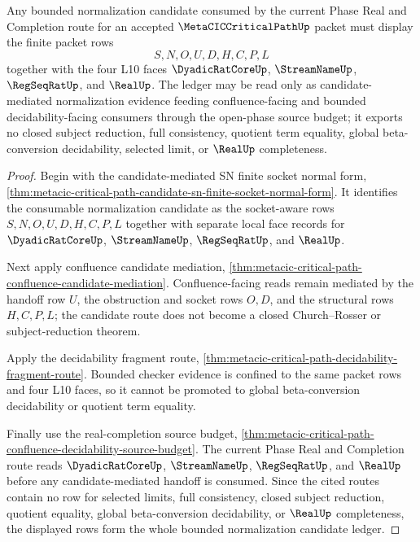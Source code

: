 \begin{theorem}
\label{thm:metacic-critical-path-bounded-normalization-candidate-ledger}
Any bounded normalization candidate consumed by the current Phase Real and Completion route for an accepted $\MetaCICCriticalPathUp$ packet must display the finite packet rows
$$
S,N,O,U,D,H,C,P,L
$$
together with the four L10 faces $\DyadicRatCoreUp$, $\StreamNameUp$, $\RegSeqRatUp$, and $\RealUp$. The ledger may be read only as candidate-mediated normalization evidence feeding confluence-facing and bounded decidability-facing consumers through the open-phase source budget; it exports no closed subject reduction, full consistency, quotient term equality, global beta-conversion decidability, selected limit, or $\RealUp$ completeness.
\end{theorem}
\begin{proof}
Begin with the candidate-mediated SN finite socket normal form, \autoref{thm:metacic-critical-path-candidate-sn-finite-socket-normal-form}. It identifies the consumable normalization candidate as the socket-aware rows $S,N,O,U,D,H,C,P,L$ together with separate local face records for $\DyadicRatCoreUp$, $\StreamNameUp$, $\RegSeqRatUp$, and $\RealUp$.

Next apply confluence candidate mediation, \autoref{thm:metacic-critical-path-confluence-candidate-mediation}. Confluence-facing reads remain mediated by the handoff row $U$, the obstruction and socket rows $O,D$, and the structural rows $H,C,P,L$; the candidate route does not become a closed Church--Rosser or subject-reduction theorem.

Apply the decidability fragment route, \autoref{thm:metacic-critical-path-decidability-fragment-route}. Bounded checker evidence is confined to the same packet rows and four L10 faces, so it cannot be promoted to global beta-conversion decidability or quotient term equality.

Finally use the real-completion source budget, \autoref{thm:metacic-critical-path-confluence-decidability-source-budget}. The current Phase Real and Completion route reads $\DyadicRatCoreUp$, $\StreamNameUp$, $\RegSeqRatUp$, and $\RealUp$ before any candidate-mediated handoff is consumed. Since the cited routes contain no row for selected limits, full consistency, closed subject reduction, quotient equality, global beta-conversion decidability, or $\RealUp$ completeness, the displayed rows form the whole bounded normalization candidate ledger.
\end{proof}

